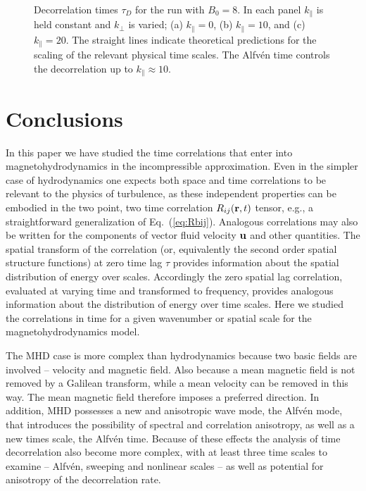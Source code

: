 \documentclass[aip,pop,reprint,amsmath,amssymb,floatfix]{revtex4-1}
\begin{document}
\begin{figure}
  \centering


  \caption{Decorrelation times $\tau_D$ for the run with $B_0=8$. In each
    panel $k_\parallel$ is held constant and $k_\perp$ is varied; (a)
    $k_\parallel = 0$, (b) $k_\parallel = 10$, and (c) $k_\parallel =
    20$. The straight lines indicate theoretical predictions for
    the scaling of the relevant physical time scales. The Alfv\'en
    time controls the decorrelation up to $k_\parallel \approx 10$.}
  \label{fig5:B8_bvf_b_kpara}
\end{figure}


\section{Conclusions}\label{sec_Conclusions}

In this paper we have studied the time correlations that enter into
magnetohydrodynamics in the incompressible approximation.  Even in the
simpler case of hydrodynamics one expects both space and time
correlations to be relevant to the physics of turbulence, as these
independent properties can be embodied in the two point, two time
correlation $R_{ij}({\bf r},t)$ tensor, e.g., a straightforward
generalization of Eq.~(\ref{eq:Rbij}).  Analogous correlations may
also be written for the components of vector fluid velocity ${\bf u}$
and other quantities.  The spatial transform of the correlation (or,
equivalently the second order spatial structure functions) at zero
time lag $\tau$ provides information about the spatial distribution of
energy over scales.  Accordingly the zero spatial lag correlation,
evaluated at varying time and transformed to frequency, provides
analogous information about the distribution of energy over time
scales.  Here we studied the correlations in time for a given
wavenumber or spatial scale for the magnetohydrodynamics model.

The MHD case is more complex than hydrodynamics because two basic
fields are involved -- velocity and magnetic field. Also because a
mean magnetic field is not removed by a Galilean transform, while a
mean velocity can be removed in this way. The mean magnetic field
therefore imposes a preferred direction.  In addition, MHD possesses a
new and anisotropic wave mode, the Alfv\'en mode, that introduces the
possibility of spectral and correlation anisotropy, as well as a new
times scale, the Alfv\'en time.  Because of these effects the analysis
of time decorrelation also become more complex, with at least three
time scales to examine -- Alfv\'en, sweeping and nonlinear scales --
as well as potential for anisotropy of the decorrelation rate.
\end{document}
